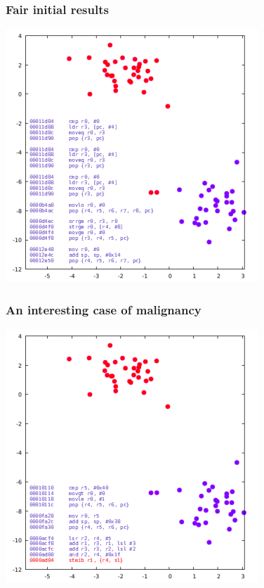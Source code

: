 \documentclass[11pt]{article}
\begin{document}
\subsubsection*{Fair initial results}
\label{sec:orgb53082a}
\begin{center}
\includegraphics[width=.9\linewidth]{./img/kathot_champion.png}
\end{center}

\subsubsection*{An interesting case of malignancy}
\label{sec:org7bc3b44}

\begin{center}
\includegraphics[width=.9\linewidth]{./img/fizwej_perfect_crash.png}
\end{center}
\end{document}
